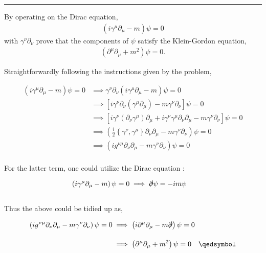 \noindent\rule{7in}{1.5pt}


\begin{problem}{4.7}
By operating on the Dirac equation,
\begin{align*}
    \left( i\gamma^\mu \partial_\mu - m \right) \psi = 0
\end{align*}
with $\gamma^\nu\partial_\nu$ prove that the components of $\psi$ satisfy the Klein-Gordon equation,
\begin{align*}
    \left( \partial^\mu \partial_\mu +m^2 \right) \psi = 0.
\end{align*}
\end{problem}
\begin{solution}
Straightforwardly following the instructions given by the problem, 

\begin{align*}
    \left( i\gamma^\mu \partial_\mu - m \right) \psi = 0  &\implies \gamma^\nu \partial_\nu \left( i\gamma^\mu \partial_\mu - m \right) \psi = 0 \\[0.15in]
     &\implies \left[  i \gamma^\nu \partial_\nu \left( \gamma^\mu \partial_\mu  \right) - m \gamma^\nu \partial_\nu \right] \psi = 0 \\[0.15in]
     &\implies \left[  i \gamma^\nu \left( \partial_\nu  \gamma^\mu \right) \partial_\mu   +  i \gamma^\nu  \gamma^\mu \partial_\nu   \partial_\mu    - m \gamma^\nu \partial_\nu \right] \psi = 0 \\[0.15in]
     &\implies \left(  \frac{i}{2} \left\{ \gamma^\nu , \gamma^\mu \right\} \partial_\nu   \partial_\mu    - m \gamma^\nu \partial_\nu \right) \psi = 0 \\[0.15in]
     &\implies \left( i g^{\nu\mu} \partial_\nu   \partial_\mu    - m \gamma^\nu \partial_\nu \right) \psi = 0 
\end{align*}\\
For the latter term, one could utilize the Dirac equation :

\begin{align*}
    \left( i\gamma^\mu \partial_\mu - m \right) \psi = 0  &\implies \slashed{\partial}\psi = -im \psi 
\end{align*}\\
Thus the above could be tidied up as, 

\begin{align*}
    \left( i g^{\nu\mu} \partial_\nu   \partial_\mu    - m \gamma^\nu \partial_\nu \right) \psi = 0 &\implies \left( i\partial^\mu\partial_\mu - m \slashed{\partial}  \right) \psi = 0 \\[0.15in]
    &\implies \left( \partial^\mu\partial_\mu +m^2 \right) \psi = 0  \qed
\end{align*}
\end{solution}

